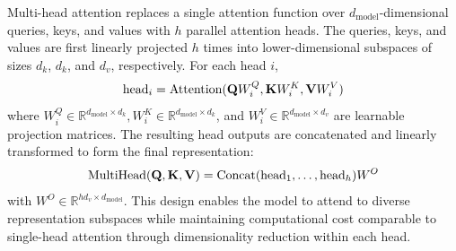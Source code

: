\documentclass[letterpaper,twocolumn,10pt]{article}
\begin{document}
Multi-head attention replaces a single attention function over $d_{\text{model}}$-dimensional queries, keys, and values with $h$ parallel attention heads. The queries, keys, and values are first linearly projected $h$ times into lower-dimensional subspaces of sizes $d_k$, $d_k$, and $d_v$, respectively. For each head $i$,
\[
    \text{head}_i = \text{Attention} ({\mathbf{Q}} W_i^{Q},{\mathbf{K}} W_i^{K}, {\mathbf{V}} W_i^{V})
\]
where $W_i^{Q} \in \mathbb{R}^{d_{\text{model}}\times d_k}, W_i^{K} \in \mathbb{R}^{d_{\text{model}}\times d_k}$, and $W_i^{V} \in \mathbb{R}^{d_{\text{model}}\times d_v}$ are learnable projection matrices. The resulting head outputs are concatenated and linearly transformed to form the final representation:
\[
\text{MultiHead}({\mathbf{Q}},{\mathbf{K}},{\mathbf{V}})=\text{Concat} (\text{head}_1,\dots,\text{head}_h) W^{O}
\]
with $W^{O} \in \mathbb{R}^{h d_v \times d_{\text{model}}}$.
This design enables the model to attend to diverse representation subspaces while maintaining computational cost comparable to single-head attention through dimensionality reduction within each head.
\end{document}
